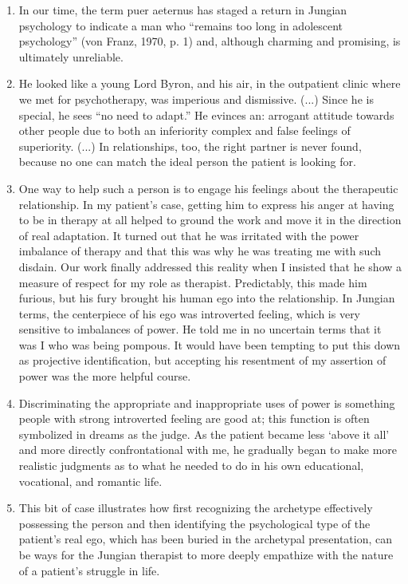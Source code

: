\begin{enumerate}

\item {} In our time, the term puer aeternus has staged a
return in Jungian psychology to indicate a man who “remains too long in
adolescent psychology” (von Franz, 1970, p. 1) and, although charming and
promising, is ultimately unreliable.

\item {} He looked like a young Lord Byron, and his air,
in the outpatient clinic where we met for psychotherapy, was imperious and
dismissive. (...) Since he is special, he sees “no need to adapt.” He evinces
an: arrogant attitude towards other people due to both an inferiority complex
and false feelings of superiority. (...) In relationships, too, the right
partner is never found, because no one can match the ideal person the patient
is looking for.

\item {} One way to help such a person is to
engage his feelings about the therapeutic relationship. In my patient’s case,
getting him to express his anger at having to be in therapy at all helped to
ground the work and move it in the direction of real adaptation. It turned out
that he was irritated with the power imbalance of therapy and that this was why
he was treating me with such disdain. Our work finally addressed this reality
when I insisted that he show a measure of respect for my role as therapist.
Predictably, this made him furious, but his fury brought his human ego into the
relationship. In Jungian terms, the centerpiece of his ego was introverted
feeling, which is very sensitive to imbalances of power. He told me in no
uncertain terms that it was I who was being pompous. It would have been
tempting to put this down as projective identification, but accepting his
resentment of my assertion of power was the more helpful course.

\item {} Discriminating the appropriate and
inappropriate uses of power is something people with strong introverted feeling
are good at; this function is often symbolized in dreams as the judge. As the
patient became less ‘above it all’ and more directly confrontational with me,
he gradually began to make more realistic judgments as to what he needed to do
in his own educational, vocational, and romantic life.

\item {} This bit of case illustrates how first
recognizing the archetype effectively possessing the person and then
identifying the psychological type of the patient’s real ego, which has been
buried in the archetypal presentation, can be ways for the Jungian therapist to
more deeply empathize with the nature of a patient’s struggle in life.

\end{enumerate}

